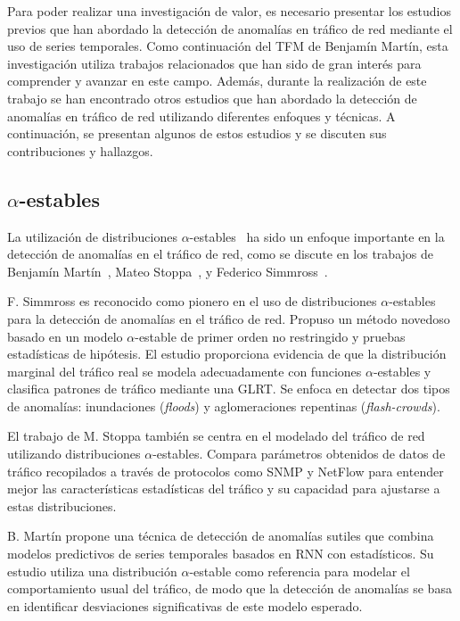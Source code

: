 Para poder realizar una investigación de valor, es necesario presentar los estudios previos que han abordado la detección de anomalías en tráfico de red mediante el uso de series temporales. Como continuación del \ac{TFM} de Benjamín Martín, esta investigación utiliza trabajos relacionados que han sido de gran interés para comprender y avanzar en este campo. Además, durante la realización de este trabajo se han encontrado otros estudios que han abordado la detección de anomalías en tráfico de red utilizando diferentes enfoques y técnicas. A continuación, se presentan algunos de estos estudios y se discuten sus contribuciones y hallazgos.

\subsection{$\alpha$-estables} %
La utilización de distribuciones $\alpha$-estables~\cite{nolan2020univariate} ha sido un enfoque importante en la detección de anomalías en el tráfico de red, como se discute en los trabajos de Benjamín Martín~\cite{benjamin2023}, Mateo Stoppa~\cite{mateo2013}, y Federico Simmross~\cite{simmross2011anomaly}.

F. Simmross es reconocido como pionero en el uso de distribuciones $\alpha$-estables para la detección de anomalías en el tráfico de red. Propuso un método novedoso basado en un modelo $\alpha$-estable de primer orden no restringido y pruebas estadísticas de hipótesis. El estudio proporciona evidencia de que la distribución marginal del tráfico real se modela adecuadamente con funciones $\alpha$-estables y clasifica patrones de tráfico mediante una \ac{GLRT}. Se enfoca en detectar dos tipos de anomalías: inundaciones (\textit{floods}) y aglomeraciones repentinas (\textit{flash-crowds}).

El trabajo de M. Stoppa también se centra en el modelado del tráfico de red utilizando distribuciones $\alpha$-estables. Compara parámetros obtenidos de datos de tráfico recopilados a través de protocolos como SNMP y NetFlow para entender mejor las características estadísticas del tráfico y su capacidad para ajustarse a estas distribuciones.

B. Martín propone una técnica de detección de anomalías sutiles que combina modelos predictivos de series temporales basados en \ac{RNN} con estadísticos. Su estudio utiliza una distribución $\alpha$-estable como referencia para modelar el comportamiento usual del tráfico, de modo que la detección de anomalías se basa en identificar desviaciones significativas de este modelo esperado.

